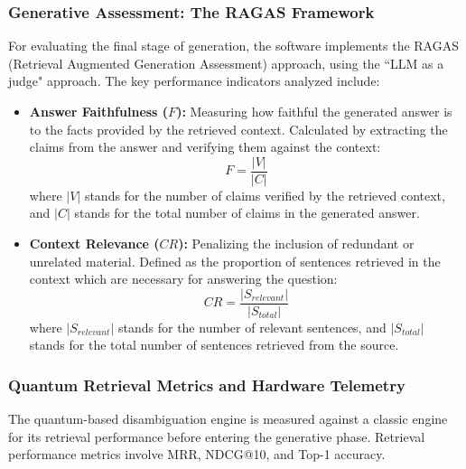 \subsubsection{Generative Assessment: The RAGAS Framework}
For evaluating the final stage of generation, the software implements the RAGAS (Retrieval Augmented Generation Assessment) approach, using the ``LLM as a judge" approach. The key performance indicators analyzed include:
\begin{itemize}
	\item \textbf{Answer Faithfulness ($F$):} Measuring how faithful the generated answer is to the facts provided by the retrieved context. Calculated by extracting the claims from the answer and verifying them against the context:
	\begin{equation}
		F = \frac{|V|}{|C|}
	\end{equation}
	where $|V|$ stands for the number of claims verified by the retrieved context, and $|C|$ stands for the total number of claims in the generated answer.
	
	\item \textbf{Context Relevance ($CR$):} Penalizing the inclusion of redundant or unrelated material. Defined as the proportion of sentences retrieved in the context which are necessary for answering the question:
	\begin{equation}
		CR = \frac{|S_{relevant}|}{|S_{total}|}
	\end{equation}
	where $|S_{relevant}|$ stands for the number of relevant sentences, and $|S_{total}|$ stands for the total number of sentences retrieved from the source.
\end{itemize}

\subsubsection{Quantum Retrieval Metrics and Hardware Telemetry}
The quantum-based disambiguation engine is measured against a classic engine for its retrieval performance before entering the generative phase. Retrieval performance metrics involve MRR, NDCG@10, and Top-1 accuracy.

